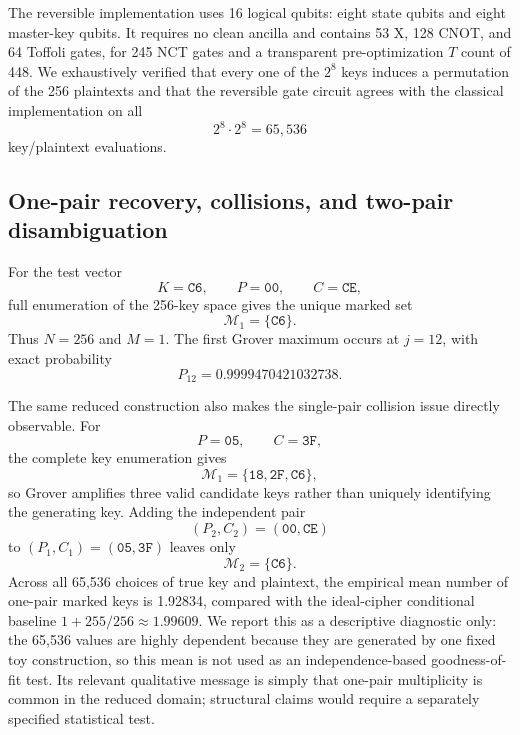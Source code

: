 \documentclass[10pt,a4paper]{article}
\begin{document}
The reversible implementation uses 16 logical qubits: eight state qubits and eight master-key qubits.  It requires no clean ancilla and contains 53 X, 128 CNOT, and 64 Toffoli gates, for 245 NCT gates and a transparent pre-optimization $T$ count of 448.  We exhaustively verified that every one of the $2^8$ keys induces a permutation of the 256 plaintexts and that the reversible gate circuit agrees with the classical implementation on all
\begin{equation}
    2^8\cdot2^8=65{,}536
\end{equation}
key/plaintext evaluations.

\subsection{One-pair recovery, collisions, and two-pair disambiguation}
For the test vector
\begin{equation}
    K=\mathtt{C6},\qquad P=\mathtt{00},\qquad C=\mathtt{CE},
\end{equation}
full enumeration of the 256-key space gives the unique marked set
\begin{equation}
    \mathcal{M}_1=\{\mathtt{C6}\}.
\end{equation}
Thus $N=256$ and $M=1$.  The first Grover maximum occurs at $j=12$, with exact probability
\begin{equation}
    P_{12}=0.9999470421032738.
\end{equation}

The same reduced construction also makes the single-pair collision issue directly observable.  For
\begin{equation}
    P=\mathtt{05},\qquad C=\mathtt{3F},
\end{equation}
the complete key enumeration gives
\begin{equation}
    \mathcal{M}_1=\{\mathtt{18},\mathtt{2F},\mathtt{C6}\},
\end{equation}
so Grover amplifies three valid candidate keys rather than uniquely identifying the generating key.  Adding the independent pair
\begin{equation}
    (P_2,C_2)=(\mathtt{00},\mathtt{CE})
\end{equation}
to $(P_1,C_1)=(\mathtt{05},\mathtt{3F})$ leaves only
\begin{equation}
    \mathcal{M}_2=\{\mathtt{C6}\}.
\end{equation}
Across all 65,536 choices of true key and plaintext, the empirical mean number of one-pair marked keys is 1.92834, compared with the ideal-cipher conditional baseline $1+255/256\approx1.99609$. We report this as a descriptive diagnostic only: the 65,536 values are highly dependent because they are generated by one fixed toy construction, so this mean is not used as an independence-based goodness-of-fit test. Its relevant qualitative message is simply that one-pair multiplicity is common in the reduced domain; structural claims would require a separately specified statistical test.
\end{document}
